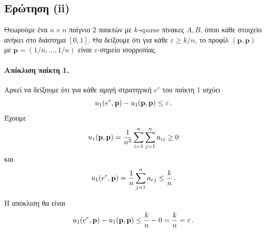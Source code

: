 \subsection{Ερώτηση (ii)}

Θεωρούμε ένα $n \times n$ παίγνιο 2 παικτών με $k$-sparse πίνακες $A, B$, όπου
κάθε στοιχείο ανήκει στο διάστημα $[0,1]$. Θα δείξουμε ότι για κάθε
$\varepsilon \geq k/n$, το προφίλ
$(\mathbf{p}, \mathbf{p})$ με $\mathbf{p} = (1/n, \ldots, 1/n)$ είναι
$\varepsilon$-σημείο ισορροπίας.

\paragraph{Απόκλιση παίκτη 1.}
Αρκεί να δείξουμε ότι για κάθε αμιγή στρατηγική $e^r$ του παίκτη 1 ισχύει
$$
    u_1(e^r, \textbf{p}) - u_1(\textbf{p}, \textbf{p}) \leq \varepsilon \,.
$$
Έχουμε
$$
    u_1(\textbf{p}, \textbf{p}) = \frac{1}{n^2} \sum_{i=1}^{n} \sum_{j=1}^{n} a_{ij} \geq 0
$$
και
$$
    u_1(e^r, \textbf{p}) = \frac{1}{n} \sum_{j=1}^{n} a_{rj} \leq \frac{k}{n} \,.
$$

Η απόκλιση θα είναι
$$
    u_1(e^r, \textbf{p}) - u_1(\textbf{p}, \textbf{p}) \leq \frac{k}{n} - 0 = \frac{k}{n} = \varepsilon \,.
$$
